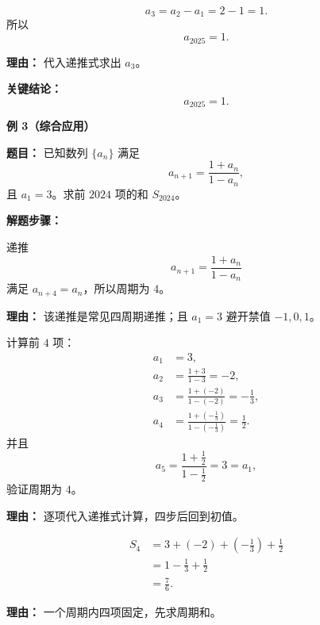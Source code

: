 \begin{examplebox}
\begin{description}[style=nextline, leftmargin=2.8em, labelsep=0.5em, itemsep=0.45em]
		\item[\textbf{第三步（计算数值）：}]
		      \[
			      a_3=a_2-a_1=2-1=1.
		      \]
		      所以
		      \[
			      a_{2025}=1.
		      \]
		      \par\textbf{理由：} 代入递推式求出 \(a_3\)。
	\end{description}

	\textbf{\textcolor{CExample}{关键结论：}}
	\[
		\boxed{a_{2025}=1}.
	\]

	\medskip
	\textbf{\textcolor{CExample}{例 3（综合应用）}}

	\textbf{\textcolor{CExample}{题目：}}
	已知数列 \(\{a_n\}\) 满足
	\[
		a_{n+1}=\frac{1+a_n}{1-a_n},
	\]
	且 \(a_1=3\)。求前 \(2024\) 项的和 \(S_{2024}\)。

	\textbf{\textcolor{CExample}{解题步骤：}}
	\begin{description}[style=nextline, leftmargin=2.8em, labelsep=0.5em, itemsep=0.45em]
		\item[\textbf{第一步（判断周期）：}]
		      递推
		      \[
			      a_{n+1}=\frac{1+a_n}{1-a_n}
		      \]
		      满足 \(a_{n+4}=a_n\)，所以周期为 \(4\)。
		      \par\textbf{理由：} 该递推是常见四周期递推；且 \(a_1=3\) 避开禁值 \(-1,0,1\)。

		\item[\textbf{第二步（求一个周期内的项）：}]
		      计算前 \(4\) 项：
		      \[
			      \begin{aligned}
				      a_1 & =3,                                                               \\[2pt]
				      a_2 & =\frac{1+3}{1-3}=-2,                                              \\[2pt]
				      a_3 & =\frac{1+(-2)}{1-(-2)}=-\frac13,                                  \\[2pt]
				      a_4 & =\frac{1+\left(-\frac13\right)}{1-\left(-\frac13\right)}=\frac12.
			      \end{aligned}
		      \]
		      并且
		      \[
			      a_5=\frac{1+\frac12}{1-\frac12}=3=a_1,
		      \]
		      验证周期为 \(4\)。
		      \par\textbf{理由：} 逐项代入递推式计算，四步后回到初值。

		\item[\textbf{第三步（求一个周期和）：}]
		      \[
			      \begin{aligned}
				      S_4
				       & =3+(-2)+\left(-\frac13\right)+\frac12 \\[2pt]
				       & =1-\frac13+\frac12                    \\[2pt]
				       & =\frac76.
			      \end{aligned}
		      \]
		      \par\textbf{理由：} 一个周期内四项固定，先求周期和。


\end{description}
\end{examplebox}
